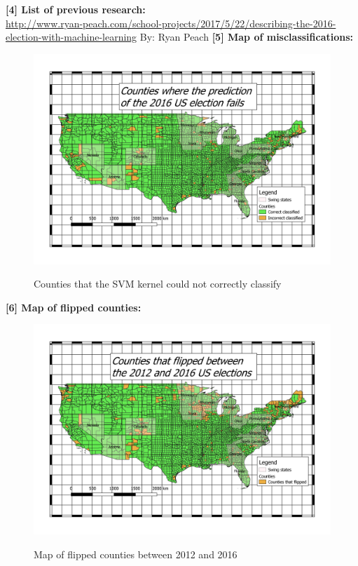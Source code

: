 \textbf{[4] List of previous research:}\\
{\scriptsize \url{http://www.ryan-peach.com/school-projects/2017/5/22/describing-the-2016-election-with-machine-learning} By: Ryan Peach}
\newpage
\textbf{[5] Map of misclassifications:}\\
\begin{figure}[H]
\centering
{\includegraphics[scale=0.33]{pictures/results/pred}\label{fig:f3}}
\caption{Counties that the SVM kernel could not correctly classify}
\end{figure}

\textbf{[6] Map of flipped counties:}\\
\begin{figure}[H]
\centering
{\includegraphics[scale=0.33]{pictures/results/flipps}\label{fig:f3}}
\caption{Map of flipped counties between 2012 and 2016}
\end{figure}

